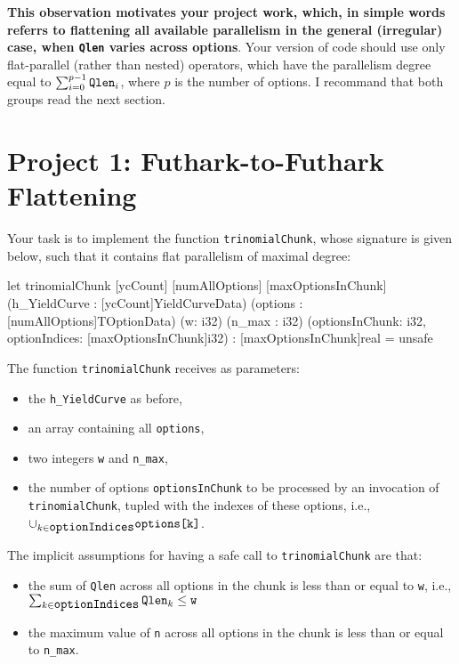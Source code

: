 \documentclass[a4paper,11pt]{article}
\begin{document}
\textbf{This observation motivates your project work, which, in simple words
referrs to flattening all available parallelism in the general 
(irregular) case, when {\tt Qlen} varies across options}. Your
version of code should use only flat-parallel (rather than nested) operators,
which have the parallelism degree equal to $\sum_{i=0}^{p-1} \mbox{\tt Qlen}_i$,
where $p$ is the number of options. I recommand that both groups 
read the next section.

\section{Project 1: Futhark-to-Futhark Flattening}

Your task is to implement the function {\tt trinomialChunk},
whose signature is given below, such that it contains flat
parallelism of maximal degree:

\begin{fancycode}
let trinomialChunk [ycCount] [numAllOptions] [maxOptionsInChunk]
                   (h_YieldCurve : [ycCount]YieldCurveData)
                   (options : [numAllOptions]TOptionData) 
                   (w: i32)
                   (n_max : i32)
                   (optionsInChunk: i32, optionIndices: [maxOptionsInChunk]i32)
                 : [maxOptionsInChunk]real = unsafe
\end{fancycode}

The function {\tt trinomialChunk} receives as parameters:
\begin{itemize}
    \item the {\tt h\_YieldCurve} as before,
    \item an array containing all {\tt options},
    \item two integers {\tt w} and {\tt n\_max},
    \item the number of options {\tt optionsInChunk} to 
            be processed by an invocation of 
            {\tt trinomialChunk}, tupled with the
            indexes of these options, i.e., 
            $\cup_{k\in\mbox{\tt optionIndices}} \mbox{\tt options[k]}$.
\end{itemize}

The implicit assumptions for having a safe call to {\tt trinomialChunk} are that:
\begin{itemize}
    \item the sum of {\tt Qlen} across all options in the chunk is less than
            or equal to {\tt w}, i.e.,\\ 
            $\sum_{k\in\mbox{\tt optionIndices}}\mbox{\tt Qlen}_k \leq \mbox{\tt w}$
    \item the maximum value of {\tt n} across all options in the chunk is less than
            or equal to {\tt n\_max}.
\end{itemize}
\end{document}
